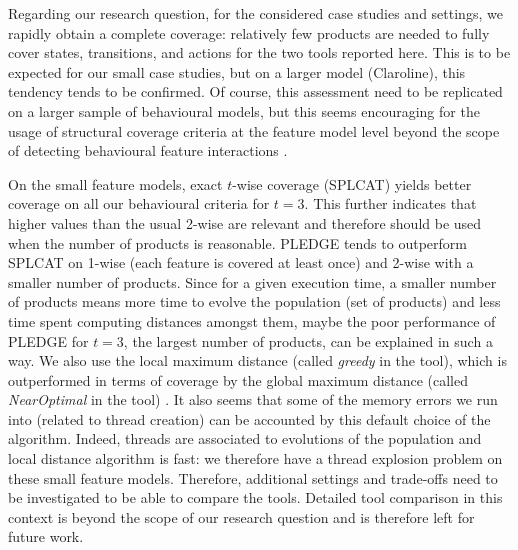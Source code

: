 Regarding our research question, for the considered case studies and settings, we rapidly obtain a complete coverage: relatively few products are needed to fully cover states, transitions, and actions for the two tools reported here. This is to be expected for our small case studies, but on a larger model (Claroline), this tendency tends to be confirmed. Of course, this assessment need to be replicated on a larger sample of behavioural models, but this seems encouraging for the usage of structural coverage criteria at the feature model level beyond the scope of detecting behavioural feature interactions \cite{Cichos2011}. 

On the small feature models, exact $t$-wise coverage (SPLCAT) yields better coverage on all our behavioural criteria for $t=3$. This further indicates that higher values than the usual 2-wise are relevant \cite{Steffens2012} and therefore should be used when the number of products is reasonable. PLEDGE tends to outperform  SPLCAT on 1-wise (each feature is covered at least once) and 2-wise with a smaller number of products. Since for a given execution time, a smaller number of products means more time to  evolve the population (set of products) and less time spent computing distances amongst them, maybe the poor performance of PLEDGE for $t=3$, the largest number of products, can be explained in such a way. We also use the local maximum distance  (called \textit{greedy} in the tool), which is outperformed in terms of coverage by the global maximum distance (called \textit{NearOptimal} in the tool) \cite{Henard2014}. It also  seems that some of the memory errors we run into (related to thread creation) can be accounted by this default choice of the algorithm. Indeed, threads are associated to evolutions of the population and local distance algorithm is fast: we therefore have a thread explosion problem on these small feature models. Therefore, additional settings and trade-offs need to be investigated to be able to compare the tools. Detailed tool comparison in this context is beyond the scope of our research question and is therefore left for future work.

